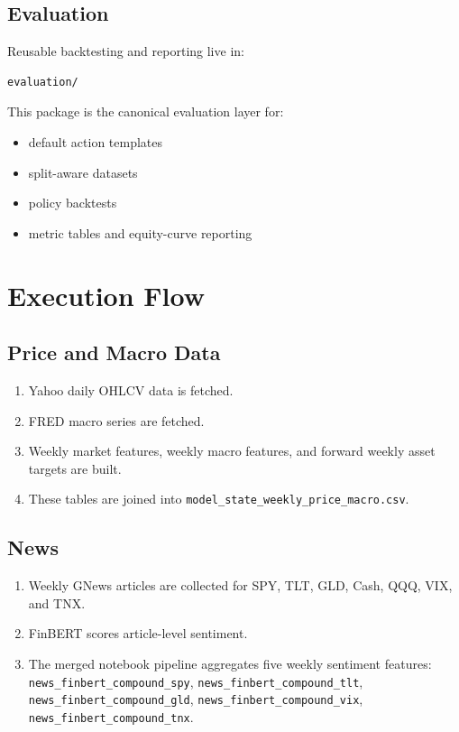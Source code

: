 \documentclass[11pt,a4paper]{article}
\begin{document}
\subsection{Evaluation}

Reusable backtesting and reporting live in:
\begin{verbatim}
evaluation/
\end{verbatim}

This package is the canonical evaluation layer for:
\begin{itemize}[nosep]
    \item default action templates
    \item split-aware datasets
    \item policy backtests
    \item metric tables and equity-curve reporting
\end{itemize}

\section{Execution Flow}

\subsection{Price and Macro Data}

\begin{enumerate}[nosep]
    \item Yahoo daily OHLCV data is fetched.
    \item FRED macro series are fetched.
    \item Weekly market features, weekly macro features, and forward weekly asset targets are built.
    \item These tables are joined into \texttt{model\_state\_weekly\_price\_macro.csv}.
\end{enumerate}

\subsection{News}

\begin{enumerate}[nosep]
    \item Weekly GNews articles are collected for SPY, TLT, GLD, Cash, QQQ, VIX, and TNX.
    \item FinBERT scores article-level sentiment.
    \item The merged notebook pipeline aggregates five weekly sentiment features:
    \texttt{news\_finbert\_compound\_spy},
    \texttt{news\_finbert\_compound\_tlt},
    \texttt{news\_finbert\_compound\_gld},
    \texttt{news\_finbert\_compound\_vix},
    \texttt{news\_finbert\_compound\_tnx}.
\end{enumerate}
\end{document}
